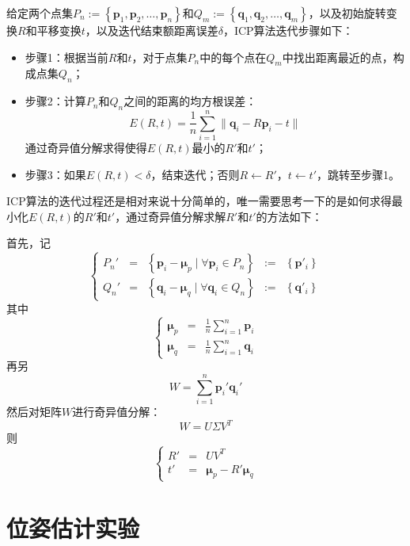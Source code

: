 给定两个点集$P_n:=\left\{\mathbf{p}_1,\mathbf{p}_2,\ldots,\mathbf{p}_n\right\}$和$Q_m:=\left\{\mathbf{q}_1,\mathbf{q}_2,\ldots,\mathbf{q}_m\right\}$，以及初始旋转变换$R$和平移变换$t$，以及迭代结束额距离误差$\delta$，ICP算法迭代步骤如下：
\begin{itemize}
\item {\kai 步骤1：}根据当前$R$和$t$，对于点集$P_n$中的每个点在$Q_m$中找出距离最近的点，构成点集$Q_n$；
\item {\kai 步骤2：}计算$P_n$和$Q_n$之间的距离的均方根误差：
  \begin{equation}
    E(R,t) = \frac{1}{n}\sum_{i=1}^n{\parallel \mathbf{q}_i - R\mathbf{p}_i - t\parallel}
  \end{equation}
  通过奇异值分解求得使得$E(R,t)$最小的$R'$和$t'$；
\item {\kai 步骤3：}如果$E(R,t) < \delta$，结束迭代；否则$R\leftarrow R'$，$t\leftarrow t'$，跳转至步骤1。
\end{itemize}

ICP算法的迭代过程还是相对来说十分简单的，唯一需要思考一下的是如何求得最小化$E(R,t)$的$R'$和$t'$，通过奇异值分解求解$R'$和$t'$的方法如下：

首先，记
\begin{equation}
  \left\{
  \begin{array}{ccccc}
  P_n'& = &\left\{\mathbf{p}_i-\mathbf{\mu}_p \;|\; \forall \mathbf{p}_i \in P_n\right\}&:=&\left\{\mathbf{p}'_i\right\}\\
  Q_n'& = &\left\{\mathbf{q}_i-\mathbf{\mu}_q \;|\; \forall \mathbf{q}_i \in Q_n\right\}&:=&\left\{\mathbf{q}'_i\right\}
  \end{array}
  \right.
\end{equation}
其中
\begin{equation}
  \left\{
    \begin{array}{ccc}
      \mathbf{\mu}_p&=&\frac{1}{n}\sum_{i=1}^n{\mathbf{p}_i}\\
      \mathbf{\mu}_q&=&\frac{1}{n}\sum_{i=1}^n{\mathbf{q}_i}
    \end{array}
  \right.
\end{equation}
再另
\begin{equation}
  W = \sum_{i=1}^n{\mathbf{p}_i'\mathbf{q}_i'}
\end{equation}
然后对矩阵$W$进行奇异值分解：
\begin{equation}
  W = U\Sigma V^T
\end{equation}
则
\begin{equation}
  \left\{
    \begin{array}{ccc}
      R'&=&UV^T \\
        t'&=&\mathbf{\mu}_p-R'\mathbf{\mu}_q
    \end{array}
    \right.
\end{equation}



\section{位姿估计实验}



